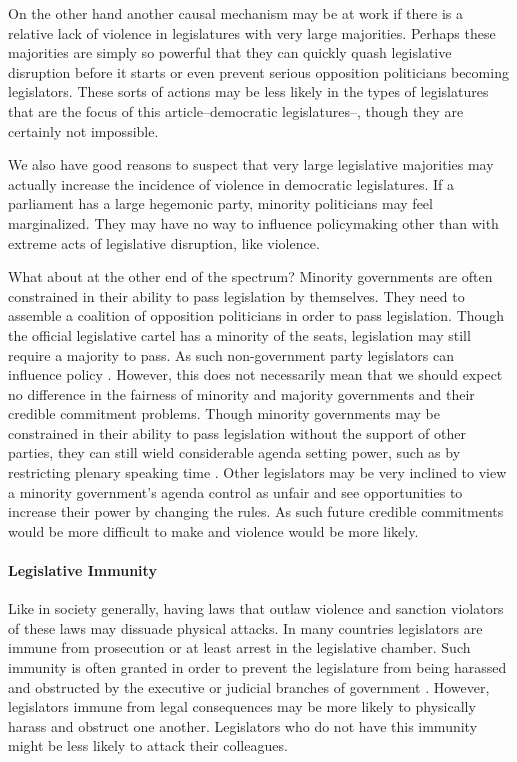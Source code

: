 \documentclass[a4paper]{article}\usepackage[]{graphicx}\usepackage[]{color}
\begin{document}
On the other hand another causal mechanism may be at work if there is a relative lack of violence in legislatures with very large majorities. Perhaps these majorities are simply so powerful that they can quickly quash legislative disruption before it starts or even prevent serious opposition politicians becoming legislators. These sorts of actions may be less likely in the types of legislatures that are the focus of this article--democratic legislatures--, though they are certainly not impossible.

We also have good reasons to suspect that very large legislative majorities may actually increase the incidence of violence in democratic legislatures. If a parliament has a large hegemonic party, minority politicians may feel marginalized. They may have no way to influence policymaking other than with extreme acts of legislative disruption, like violence.

What about at the other end of the spectrum? Minority governments are often constrained in their ability to pass legislation by themselves. They need to assemble a coalition of opposition politicians in order to pass legislation. Though the official legislative cartel has a minority of the seats, legislation may still require a majority to pass. As such non-government party legislators can influence policy \citep{strom1990minority}. However, this does not necessarily mean that we should expect no difference in the fairness of minority and majority governments and their credible commitment problems. Though minority governments may be constrained in their ability to pass legislation without the support of other parties, they can still wield considerable agenda setting power, such as by restricting plenary speaking time \citep{tsebelis2002,cox2005,cox2007}. Other legislators may be very inclined to view a minority government's agenda control as unfair and see opportunities to increase their power by changing the rules. As such future credible commitments would be more difficult to make and violence would be more likely.

\paragraph{Legislative Immunity}

Like in society generally, having laws that outlaw violence and sanction violators of these laws may dissuade physical attacks. In many countries legislators are immune from prosecution or at least arrest in the legislative chamber. Such immunity is often granted in order to prevent the legislature from being harassed and obstructed by the executive or judicial branches of government  \citep{Seghetti1984}. However, legislators immune from legal consequences may be more likely to physically harass and obstruct one another. Legislators who do not have this immunity might be less likely to attack their colleagues.
\end{document}
